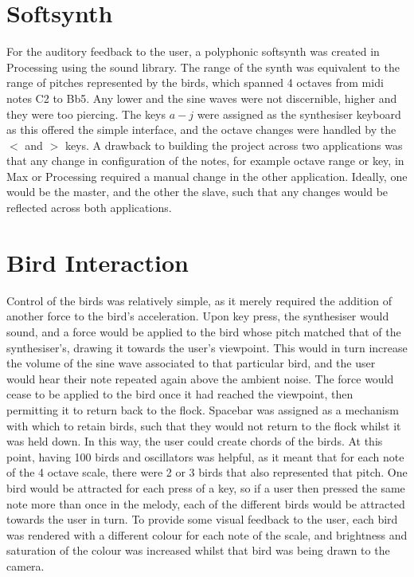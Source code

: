 \documentclass[journal, a4paper]{IEEEtran}
\begin{document}
\section*{Softsynth}
For the auditory feedback to the user, a polyphonic softsynth was created in Processing using the sound library. The range of the synth was equivalent to the range of pitches represented by the birds, which spanned 4 octaves from midi notes C2 to Bb5. Any lower and the sine waves were not discernible, higher and they were too piercing. The keys $a-j$ were assigned as the synthesiser keyboard as this offered the simple interface, and the octave changes were handled by the $<$ and $>$ keys.
A drawback to building the project across two applications was that any change in configuration of the notes, for example octave range or key, in Max or Processing required a manual change in the other application. Ideally, one would be the master, and the other the slave, such that any changes would be reflected across both applications.

\section*{Bird Interaction}
Control of the birds was relatively simple, as it merely required the addition of another force to the bird's acceleration. Upon key press, the synthesiser would sound, and a force would be applied to the bird whose pitch matched that of the synthesiser's, drawing it towards the user's viewpoint. This would in turn increase the volume of the sine wave associated to that particular bird, and the user would hear their note repeated again above the ambient noise. The force would cease to be applied to the bird once it had reached the viewpoint, then permitting it to return back to the flock.
Spacebar was assigned as a mechanism with which to retain birds, such that they would not return to the flock whilst it was held down. In this way, the user could create chords of the birds. At this point, having 100 birds and oscillators was helpful, as it meant that for each note of the 4 octave scale, there were 2 or 3 birds that also represented that pitch. One bird would be attracted for each press of a key, so if a user then pressed the same note more than once in the melody, each of the different birds would be attracted towards the user in turn.
To provide some visual feedback to the user, each bird was rendered with a different colour for each note of the scale, and brightness and saturation of the colour was increased whilst that bird was being drawn to the camera.
\end{document}
